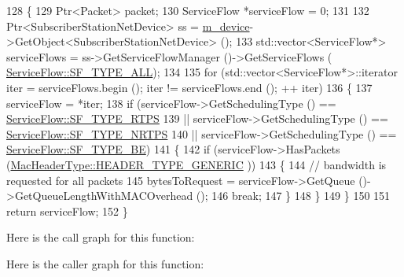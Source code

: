 \begin{DoxyCode}
128 \{
129   Ptr<Packet> packet;
130   ServiceFlow *serviceFlow = 0;
131 
132   Ptr<SubscriberStationNetDevice> ss = \hyperlink{classns3_1_1BandwidthManager_a55eadfdb1964dad9875f14dfcf48eaed}{m\_device}->GetObject<SubscriberStationNetDevice> ();
133   std::vector<ServiceFlow*> serviceFlows = ss->GetServiceFlowManager ()->GetServiceFlows (
      \hyperlink{classns3_1_1ServiceFlow_a7990ba10be1e098328fd1e6382a26235aaf7e58e43027cc9d351cd100a9d6dee3}{ServiceFlow::SF\_TYPE\_ALL});
134 
135   \textcolor{keywordflow}{for} (std::vector<ServiceFlow*>::iterator iter = serviceFlows.begin (); iter != serviceFlows.end (); ++
      iter)
136     \{
137       serviceFlow = *iter;
138       \textcolor{keywordflow}{if} (serviceFlow->GetSchedulingType () == \hyperlink{classns3_1_1ServiceFlow_a7990ba10be1e098328fd1e6382a26235a0e98ff713b932a029acad7e5b24bbf55}{ServiceFlow::SF\_TYPE\_RTPS}
139           || serviceFlow->GetSchedulingType () == \hyperlink{classns3_1_1ServiceFlow_a7990ba10be1e098328fd1e6382a26235a7f8577f851a9f01d159442a3a3fcdf48}{ServiceFlow::SF\_TYPE\_NRTPS}
140           || serviceFlow->GetSchedulingType () == \hyperlink{classns3_1_1ServiceFlow_a7990ba10be1e098328fd1e6382a26235af93a8bd8fce654e688f957f6f362e5c7}{ServiceFlow::SF\_TYPE\_BE})
141         \{
142           \textcolor{keywordflow}{if} (serviceFlow->HasPackets (\hyperlink{classns3_1_1MacHeaderType_a54d8fc8bc93a2b7865627965cdd31c20a48fe5b2f20cadf78008c71469b518403}{MacHeaderType::HEADER\_TYPE\_GENERIC}
      ))
143             \{
144               \textcolor{comment}{// bandwidth is requested for all packets}
145               bytesToRequest = serviceFlow->GetQueue ()->GetQueueLengthWithMACOverhead ();
146               \textcolor{keywordflow}{break};
147             \}
148         \}
149     \}
150 
151   \textcolor{keywordflow}{return} serviceFlow;
152 \}
\end{DoxyCode}


Here is the call graph for this function\+:




Here is the caller graph for this function\+:


